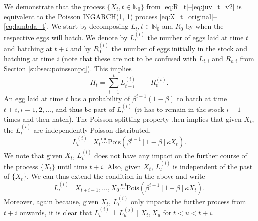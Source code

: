 \documentclass{article}
\begin{document}
We demonstrate that the process $\{X_t, t \in \mathbb{N}_0\}$ from \eqref{eq:R_t}--\eqref{eq:juv_t_v2} is equivalent to the Poisson INGARCH(1, 1) process \eqref{eq:X_t_original}--\eqref{eq:lambda_t}. We start by decomposing $L_t, t \in \mathbb{N}_0$ and $R_0$ by when the respective eggs will hatch. We denote by $L_t^{(i)}$ the number of eggs laid at time $t$ and hatching at $t + i$ and by $R^{(i)}_0$ the number of eggs initially in the stock and hatching at time $i$ (note that these are not to be confused with $L_{t, i}$ and $R_{o, i}$ from Section \ref{subsec:poinssonpq}). This implies
\begin{equation}
H_t = \sum_{i = 1}^{t} L_{t - i}^{(i)} \ \ + \ \ R_0^{(t)}.
\label{eq:sums}
\end{equation}
An egg laid at time $t$ has a probability of $\beta^{i - 1}(1 - \beta)$ to hatch at time $t + i, i = 1, 2, \dots$, and thus be part of $L_t^{(i)}$ (it has to remain in the stock $i - 1$ times and then hatch). The Poisson splitting property \cite{Kingman1993} then implies that given $X_t$, the $L_t^{(i)}$ are independently Poisson distributed,
$$
L_t^{(i)} \mid X_t \stackrel{\text{ind}}{\sim} \text{Pois}(\beta^{i - 1}[1 - \beta]\kappa X_t). %
$$
We note that given $X_t$, $L_t^{(i)}$ does not have any impact on the further course of the process $\{X_t\}$ until time $t + i$. Also, given $X_t$, $L_t^{(i)}$ is independent of the past of $\{X_t\}$. We can thus extend the condition in the above and write
$$
L_t^{(i)} \mid X_{t + i - 1}, \dots, X_0 \stackrel{\text{ind}}{\sim} \text{Pois}(\beta^{i - 1}[1 - \beta]\kappa X_t). %
$$
Moreover, again because, given $X_t$, $L_t^{(i)}$ only impacts the further process from $t + i$ onwards, it is clear that $L_t^{(i)} \perp L_u^{(j)} \mid X_t, X_u$ for $t < u < t + i$.
\end{document}
